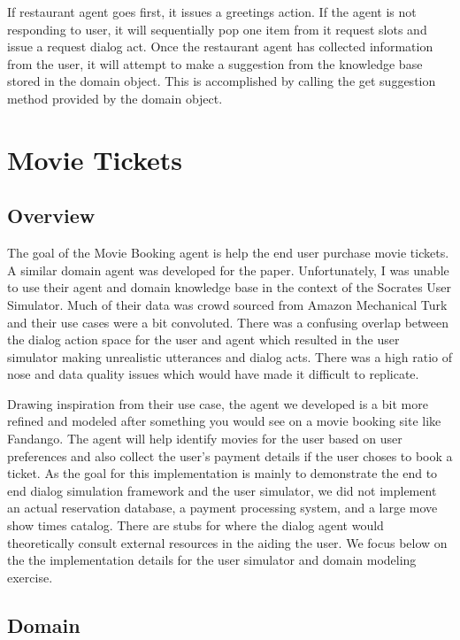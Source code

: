 If restaurant agent goes first, it issues a greetings action. If the agent is not responding to user, it will sequentially pop one item from it request slots and issue a request dialog act. Once the restaurant agent has collected information from the user, it will attempt to make a suggestion from the knowledge base stored in the domain object. This is accomplished by calling the get suggestion method provided by the domain object.

\section{Movie Tickets}

\subsection{Overview}
The goal of the Movie Booking agent is help the end user purchase movie tickets. A similar domain agent was developed for the \cite{li_usersim} paper. Unfortunately, I was unable to use their agent and domain knowledge base in the context of the Socrates User Simulator. Much of their data was crowd sourced from Amazon Mechanical Turk and their use cases were a bit convoluted. There was a confusing overlap between the dialog action space for the user and agent which resulted in the user simulator making unrealistic utterances and dialog acts. There was a high ratio of nose and data quality issues which would have made it difficult to replicate.  

Drawing inspiration from their use case, the agent we developed is a bit more refined and modeled after something you would see on a movie booking site like Fandango. The agent will help identify movies for the user based on user preferences and also collect the user's payment details if the user choses to book a ticket. As the goal for this implementation is mainly to demonstrate the end to end dialog simulation framework and the user simulator, we did not implement an actual reservation database, a payment processing system, and a large move show times catalog. There are stubs for where the dialog agent would theoretically consult external resources in the aiding the user. We focus below on the the implementation details for the user simulator and domain modeling exercise.  

\subsection{Domain}

